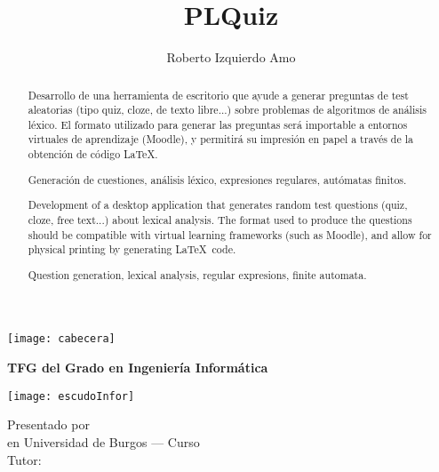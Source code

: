 \documentclass[a4paper,11pt,oneside]{memoir}
\title{PLQuiz}
\author{Roberto Izquierdo Amo}
\date{}
\makeatletter
\def\maketitle{
  \null
  \thispagestyle{empty}
\noindent\texttt{[image: cabecera]}\vspace{1cm}%
  \vfill
  \colorbox{cpardoBox}{%
    \begin{minipage}{.8\textwidth}
      \vspace{.5cm}\Large
      \begin{center}
      \textbf{TFG del Grado en Ingeniería Informática}\vspace{.6cm}\\
      \textbf{\LARGE\@title{}}
      \end{center}
      \vspace{.2cm}
    \end{minipage}

  }%
  \hfill\begin{minipage}{.20\textwidth}
    \texttt{[image: escudoInfor]}
  \end{minipage}
  \vfill
  \begin{center}%
  {%
    \noindent\LARGE
    Presentado por \@author{}\\%
    en Universidad de Burgos --- Curso \@course{}\\
    Tutor: \@tutor{}
  }\\%
  \end{center}%
  \null
  \cleardoublepage
  }
\makeatother
\begin{document}
\maketitle

\frontmatter

\renewcommand*\abstractname{Resumen}
\begin{abstract}
Desarrollo de una herramienta de escritorio que ayude a generar preguntas de test aleatorias (tipo quiz, cloze, de texto libre...) sobre problemas de algoritmos de análisis léxico.
El formato utilizado para generar las preguntas será importable a entornos virtuales de aprendizaje (Moodle), y permitirá su impresión en papel a través de la obtención de código \LaTeX .
\end{abstract}

\renewcommand*\abstractname{Descriptores}
\begin{abstract}
Generación de cuestiones, análisis léxico, expresiones regulares, autómatas finitos.
\end{abstract}

\clearpage

\renewcommand*\abstractname{Abstract}
\begin{abstract}
Development of a desktop application that generates random test questions (quiz, cloze, free text...) about lexical analysis.
The format used to produce the questions should be compatible with virtual learning frameworks (such as Moodle), and allow for physical printing by generating \LaTeX\ code.
\end{abstract}

\renewcommand*\abstractname{Keywords}
\begin{abstract}
Question generation, lexical analysis, regular expresions, finite automata.
\end{abstract}

\clearpage

\tableofcontents

\clearpage

\listoffigures

\clearpage

\listoftables

\clearpage

\mainmatter

%



%
%

\appendix





\end{document}
